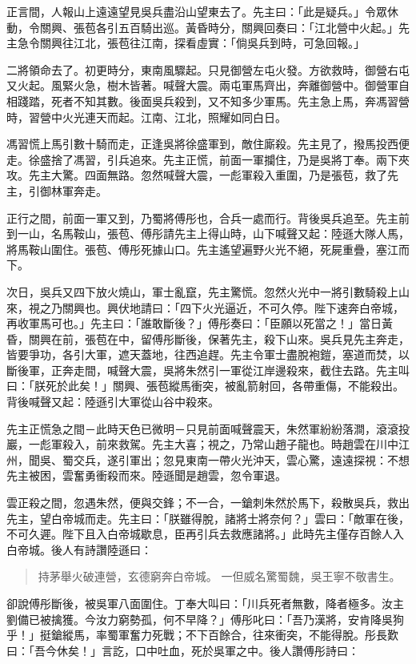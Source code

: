 正言間，人報山上遠遠望見吳兵盡沿山望東去了。先主曰：「此是疑兵。」令眾休動，令關興、張苞各引五百騎出巡。黃昏時分，關興回奏曰：「江北營中火起。」先主急令關興往江北，張苞往江南，探看虛實：「倘吳兵到時，可急回報。」

二將領命去了。初更時分，東南風驟起。只見御營左屯火發。方欲救時，御營右屯又火起。風緊火急，樹木皆著。喊聲大震。兩屯軍馬齊出，奔離御營中。御營軍自相踐踏，死者不知其數。後面吳兵殺到，又不知多少軍馬。先主急上馬，奔馮習營時，習營中火光連天而起。江南、江北，照耀如同白日。

馮習慌上馬引數十騎而走，正逢吳將徐盛軍到，敵住廝殺。先主見了，撥馬投西便走。徐盛捨了馮習，引兵追來。先主正慌，前面一軍攔住，乃是吳將丁奉。兩下夾攻。先主大驚。四面無路。忽然喊聲大震，一彪軍殺入重圍，乃是張苞，救了先主，引御林軍奔走。

正行之間，前面一軍又到，乃蜀將傅彤也，合兵一處而行。背後吳兵追至。先主前到一山，名馬鞍山，張苞、傅彤請先主上得山時，山下喊聲又起：陸遜大隊人馬，將馬鞍山圍住。張苞、傅彤死據山口。先主遙望遍野火光不絕，死屍重疊，塞江而下。

次日，吳兵又四下放火燒山，軍士亂竄，先主驚慌。忽然火光中一將引數騎殺上山來，視之乃關興也。興伏地請曰：「四下火光逼近，不可久停。陛下速奔白帝城，再收軍馬可也。」先主曰：「誰敢斷後？」傅彤奏曰：「臣願以死當之！」當日黃昏，關興在前，張苞在中，留傅彤斷後，保著先主，殺下山來。吳兵見先主奔走，皆要爭功，各引大軍，遮天蓋地，往西追趕。先主令軍士盡脫袍鎧，塞道而焚，以斷後軍，正奔走間，喊聲大震，吳將朱然引一軍從江岸邊殺來，截住去路。先主叫曰：「朕死於此矣！」關興、張苞縱馬衝突，被亂箭射回，各帶重傷，不能殺出。背後喊聲又起：陸遜引大軍從山谷中殺來。

先主正慌急之間－此時天色已微明－只見前面喊聲震天，朱然軍紛紛落澗，滾滾投巖，一彪軍殺入，前來救駕。先主大喜；視之，乃常山趙子龍也。時趙雲在川中江州，聞吳、蜀交兵，遂引軍出；忽見東南一帶火光沖天，雲心驚，遠遠探視：不想先主被困，雲奮勇衝殺而來。陸遜聞是趙雲，忽令軍退。

雲正殺之間，忽遇朱然，便與交鋒；不一合，一鎗刺朱然於馬下，殺散吳兵，救出先主，望白帝城而走。先主曰：「朕雖得脫，諸將士將奈何？」雲曰：「敵軍在後，不可久遲。陛下且入白帝城歇息，臣再引兵去救應諸將。」此時先主僅存百餘人入白帝城。後人有詩讚陸遜曰：

\begin{quote}
持茅舉火破連營，玄德窮奔白帝城。
一但威名驚蜀魏，吳王寧不敬書生。
\end{quote}

卻說傅彤斷後，被吳軍八面圍住。丁奉大叫曰：「川兵死者無數，降者極多。汝主劉備已被擒獲。今汝力窮勢孤，何不早降？」傅彤叱曰：「吾乃漢將，安肯降吳狗乎！」挺鎗縱馬，率蜀軍奮力死戰；不下百餘合，往來衝突，不能得脫。彤長歎曰：「吾今休矣！」言訖，口中吐血，死於吳軍之中。後人讚傅彤詩曰：

